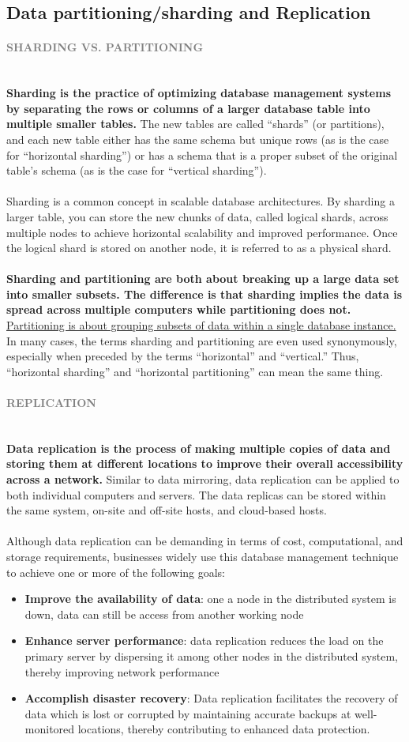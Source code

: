 \documentclass[10pt,a4paper]{article}
\newcommand{\nline}{\\~\\}
\newcommand{\myparagraph}[1]{\paragraph{\normalsize{\textcolor{gray}{\uppercase{\textbf{#1}}}} }\mbox{} \vspace{0.5em}\\}
\begin{document}
\subsection{Data partitioning/sharding and Replication}
\myparagraph{Sharding vs. Partitioning}
\textbf{Sharding is the practice of optimizing database management systems by separating the rows or columns of a larger database table into multiple smaller tables.} The new tables are called “shards” (or partitions), and each new table either has the same schema but unique rows (as is the case for “horizontal sharding”) or has a schema that is a proper subset of the original table’s schema (as is the case for “vertical sharding”).
\nline
Sharding is a common concept in scalable database architectures. By sharding a larger table, you can store the new chunks of data, called logical shards, across multiple nodes to achieve horizontal scalability and improved performance. Once the logical shard is stored on another node, it is referred to as a physical shard.
\nline
\textbf{Sharding and partitioning are both about breaking up a large data set into smaller subsets. The difference is that sharding implies the data is spread across multiple computers while partitioning does not.} \uline{Partitioning is about grouping subsets of data within a single database instance.} In many cases, the terms sharding and partitioning are even used synonymously, especially when preceded by the terms “horizontal” and “vertical.” Thus, “horizontal sharding” and “horizontal partitioning” can mean the same thing.
\pagebreak
\myparagraph{Replication}
\textbf{Data replication is the process of making multiple copies of data and storing them at different locations to improve their overall accessibility across a network.} Similar to data mirroring, data replication can be applied to both individual computers and servers. The data replicas can be stored within the same system, on-site and off-site hosts, and cloud-based hosts.
\nline
Although data replication can be demanding in terms of cost, computational, and storage requirements, businesses widely use this database management technique to achieve one or more of the following goals:
\begin{itemize}
	\item \textbf{Improve the availability of data}: one a node in the distributed system is down, data can still be access from another working node
	\item \textbf{Enhance server performance}: data replication reduces the load on the primary server by dispersing it among other nodes in the distributed system, thereby improving network performance
	\item \textbf{Accomplish disaster recovery}:  Data replication facilitates the recovery of data which is lost or corrupted by maintaining accurate backups at well-monitored locations, thereby contributing to enhanced data protection.
\end{itemize}
\end{document}
